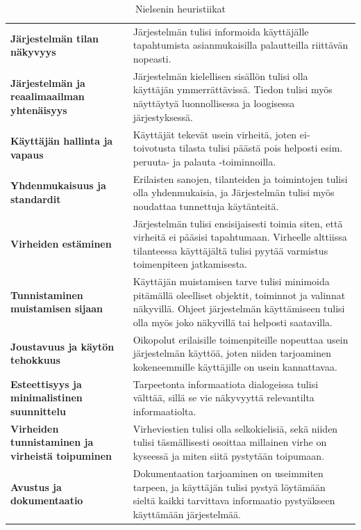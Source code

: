 \documentclass[utf8]{gradu3}
\begin{document}
\begin{table}[H]
  \centering
  \caption{Nielsenin \parencite{heuristics} heuristiikat}
    \begin{tabular}{p{12.355em}p{21.855em}}
    \multicolumn{1}{l}{\textbf{Järjestelmän tilan näkyvyys}} & Järjestelmän tulisi informoida käyttäjälle tapahtumista asianmukaisilla palautteilla riittävän nopeasti. \\
    \textbf{Järjestelmän ja reaalimaailman yhtenäisyys} & Järjestelmän kielellisen sisällön tulisi olla käyttäjän ymmerrättävissä. Tiedon tulisi myös näyttäytyä luonnollisessa ja loogisessa järjestyksessä. \\
    \multicolumn{1}{l}{\textbf{Käyttäjän hallinta ja vapaus}} & Käyttäjät tekevät usein virheitä, joten ei-toivotusta tilasta tulisi päästä pois helposti esim. peruuta- ja palauta -toiminnoilla. \\
    \multicolumn{1}{l}{\textbf{Yhdenmukaisuus ja standardit}} & Erilaisten sanojen, tilanteiden ja toimintojen tulisi olla yhdenmukaisia, ja Järjestelmän tulisi myös noudattaa tunnettuja käytänteitä. \\
    \multicolumn{1}{l}{\textbf{Virheiden estäminen}} & Järjestelmän tulisi ensisijaisesti toimia siten, että virheitä ei pääsisi tapahtumaan. Virheelle alttiissa tilanteessa käyttäjältä tulisi pyytää varmistus toimenpiteen jatkamisesta. \\
    \textbf{Tunnistaminen muistamisen sijaan} & Käyttäjän muistamisen tarve tulisi minimoida pitämällä oleelliset objektit, toiminnot ja valinnat näkyvillä. Ohjeet järjestelmän käyttämiseen tulisi olla myös joko näkyvillä tai helposti saatavilla. \\
    \multicolumn{1}{l}{\textbf{Joustavuus ja käytön tehokkuus}} & Oikopolut erilaisille toimenpiteille nopeuttaa usein järjestelmän käyttöä, joten niiden tarjoaminen kokeneemmille käyttäjille on usein kannattavaa.  \\
    \textbf{Esteettisyys ja minimalistinen suunnittelu} & Tarpeetonta informaatiota dialogeissa tulisi välttää, sillä se vie näkyvyyttä relevantilta informaatiolta. \\
    \textbf{Virheiden tunnistaminen ja virheistä toipuminen} & Virheviestien tulisi olla selkokielisiä, sekä niiden tulisi täsmällisesti osoittaa millainen virhe on kyseessä ja miten siitä pystytään toipumaan. \\
    \textbf{Avustus ja dokumentaatio} & Dokumentaation tarjoaminen on useimmiten tarpeen, ja käyttäjän tulisi pystyä löytämään sieltä kaikki tarvittava informaatio pystyäkseen käyttämään järjestelmää. \\
    \end{tabular}%
  \label{tab:addlabel}%
\end{table}%
\end{document}
